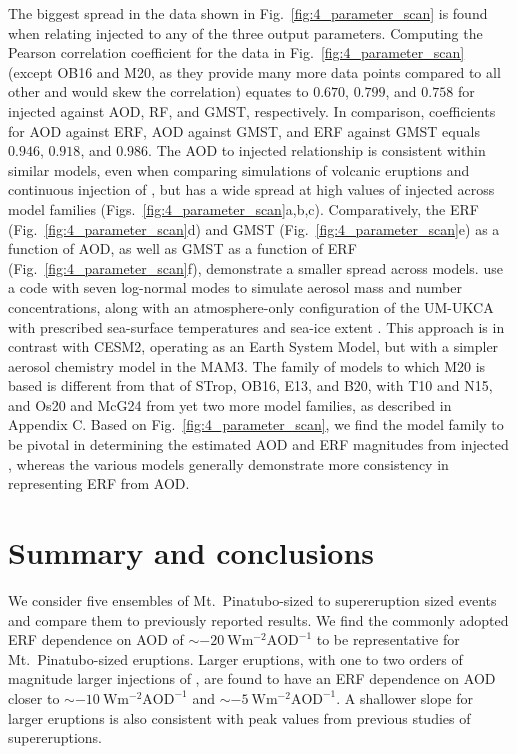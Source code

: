 \documentclass[draft]{agujournal2019}
\begin{document}
  The biggest spread in the data shown in Fig.~\ref{fig:4_parameter_scan} is found when
  relating injected  to any of the three output parameters. Computing the
  Pearson correlation coefficient for the data in Fig.~\ref{fig:4_parameter_scan}
  (except OB16 and M20, as they provide many more data points compared to all other and
  would skew the correlation) equates to \(0.670\), \(0.799\), and \(0.758\) for
  injected  against AOD, RF, and GMST, respectively. In comparison, coefficients
  for AOD against ERF, AOD against GMST, and ERF against GMST equals \(0.946\),
  \(0.918\), and \(0.986\). The AOD to injected  relationship is consistent
  within similar models, even when comparing simulations of volcanic eruptions
  \cite{timmreck2010} and continuous injection of  \cite{niemeier2015}, but has
  a wide spread at high values of injected  across model families
  (Figs.~\ref{fig:4_parameter_scan}a,b,c). Comparatively, the ERF
  (Fig.~\ref{fig:4_parameter_scan}d) and GMST (Fig.~\ref{fig:4_parameter_scan}e) as a
  function of AOD, as well as GMST as a function of ERF
  (Fig.~\ref{fig:4_parameter_scan}f), demonstrate a smaller spread across models.
   use a code with seven log-normal
  modes to simulate aerosol mass and number concentrations, along with an
  atmosphere-only configuration of the UM-UKCA with prescribed sea-surface temperatures
  and sea-ice extent \cite{marshall2019}. This approach is in contrast with CESM2,
  operating as an Earth System Model, but with a simpler aerosol chemistry model in the
  MAM3. The family of models to which M20 is based is different from that of STrop,
  OB16, E13, and B20, with T10 and N15, and Os20 and McG24 from yet two more model
  families, as described in Appendix C. Based on Fig.~\ref{fig:4_parameter_scan}, we
  find the model family to be pivotal in determining the estimated AOD and ERF
  magnitudes from injected , whereas the various models generally demonstrate
  more consistency in representing ERF from AOD.

  \section{Summary and conclusions}

  \label{sec:conclusions}

  We consider five ensembles of Mt.\ Pinatubo-sized to supereruption sized events and
  compare them to previously reported results. We find the commonly adopted ERF
  dependence on AOD of \(\sim\SI{-20}{\watt\metre^{-2}\mathrm{AOD}^{-1}}\) to be
  representative for Mt.\
  Pinatubo-sized eruptions. Larger eruptions, with one to two orders of magnitude larger
  injections of \ce{SO2}, are found to have an ERF dependence on AOD closer to
  \(\sim\SI{-10}{\watt\metre^{-2}\mathrm{AOD}^{-1}}\) and
  \(\sim\SI{-5}{\watt\metre^{-2}\mathrm{AOD}^{-1}}\). A shallower slope for larger
  eruptions is also consistent with peak values from previous studies of supereruptions.
\end{document}
